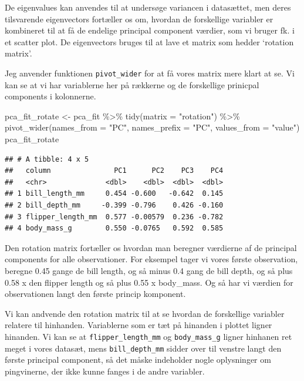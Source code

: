 \documentclass[
]{book}
\newenvironment{Shaded}{\begin{snugshade}}{\end{snugshade}}
\newcommand{\AttributeTok}[1]{\textcolor[rgb]{0.77,0.63,0.00}{#1}}
\newcommand{\FunctionTok}[1]{\textcolor[rgb]{0.00,0.00,0.00}{#1}}
\newcommand{\NormalTok}[1]{#1}
\newcommand{\OtherTok}[1]{\textcolor[rgb]{0.56,0.35,0.01}{#1}}
\newcommand{\SpecialCharTok}[1]{\textcolor[rgb]{0.00,0.00,0.00}{#1}}
\newcommand{\StringTok}[1]{\textcolor[rgb]{0.31,0.60,0.02}{#1}}
\begin{document}
De eigenvalues kan anvendes til at undersøge variancen i datasættet, men deres tilsvarende eigenvectors fortæller os om, hvordan de forskellige variabler er kombineret til at få de endelige principal component værdier, som vi bruger fk. i et scatter plot. De eigenvectors bruges til at lave et matrix som hedder `rotation matrix'.

Jeg anvender funktionen \texttt{pivot\_wider} for at få vores matrix mere klart at se. Vi kan se at vi har variablerne her på rækkerne og de forskellige prinicpal components i kolonnerne.

\begin{Shaded}
\begin{Highlighting}[]
\NormalTok{pca\_fit\_rotate }\OtherTok{\textless{}{-}}\NormalTok{ pca\_fit }\SpecialCharTok{\%\textgreater{}\%}
  \FunctionTok{tidy}\NormalTok{(}\AttributeTok{matrix =} \StringTok{"rotation"}\NormalTok{) }\SpecialCharTok{\%\textgreater{}\%} 
  \FunctionTok{pivot\_wider}\NormalTok{(}\AttributeTok{names\_from =} \StringTok{"PC"}\NormalTok{, }\AttributeTok{names\_prefix =} \StringTok{"PC"}\NormalTok{, }\AttributeTok{values\_from =} \StringTok{"value"}\NormalTok{)}
\NormalTok{pca\_fit\_rotate}
\end{Highlighting}
\end{Shaded}

\begin{verbatim}
## # A tibble: 4 x 5
##   column               PC1      PC2    PC3    PC4
##   <chr>              <dbl>    <dbl>  <dbl>  <dbl>
## 1 bill_length_mm     0.454 -0.600   -0.642  0.145
## 2 bill_depth_mm     -0.399 -0.796    0.426 -0.160
## 3 flipper_length_mm  0.577 -0.00579  0.236 -0.782
## 4 body_mass_g        0.550 -0.0765   0.592  0.585
\end{verbatim}

Den rotation matrix fortæller os hvordan man beregner værdierne af de principal components for alle observationer. For eksempel tager vi vores første observation, beregne 0.45 gange de bill length, og så minus 0.4 gang de bill depth, og så plus 0.58 x den flipper length og så plus 0.55 x body\_mass. Og så har vi værdien for observationen langt den første princip komponent.

Vi kan andvende den rotation matrix til at se hvordan de forskellige variabler relatere til hinhanden. Variablerne som er tæt på hinanden i plottet ligner hinanden. Vi kan se at \texttt{flipper\_length\_mm} og \texttt{body\_mass\_g} ligner hinhanen ret meget i vores datasæt, mens \texttt{bill\_depth\_mm} sidder over til venstre langt den første principal component, så det måske indeholder nogle oplysninger om pingvinerne, der ikke kunne fanges i de andre variabler.
\end{document}
